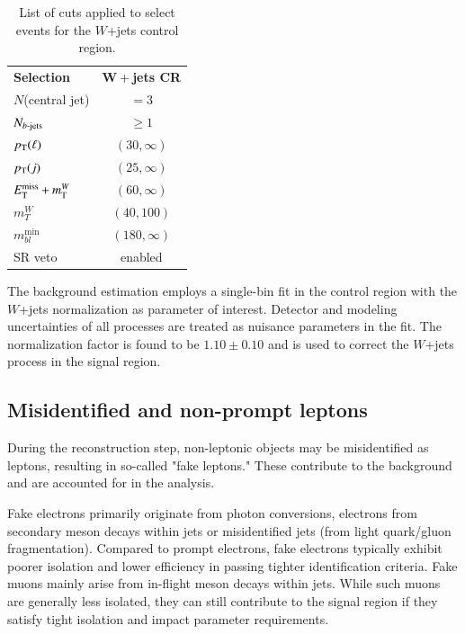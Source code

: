 \begin{table}[htbp]
    \centering
    \caption{List of cuts applied to select events for the $W$+jets control region.}%
    \begin{tabular}{l c}
      \hspace{1pt}\\
      \toprule
      \textbf{Selection}                    & $\bm{W+}$\textbf{jets CR} \\
      \midrule
      \( N \)(central jet)                  & \( = 3\)         \\
      \( N_{b\text{-jets}}\)                       & \( \geq 1 \)        \\
      \( p_{\text{T}}(\ell) \)                       & \( (30, \infty) \)  \\
      \( p_{\text{T}}(j)\)                           & \( (25, \infty) \)  \\
      \( E_{\text{T}}^{\text{miss}} + m_\mathrm{T}^W \)                     & \( (60, \infty) \)  \\
      \( m_T^W \)                           & \( (40,100) \) \\
      \(m_{bl}^\text{min}\)                 & \( (180, \infty)\) \\
      SR veto                               & enabled \\
      \bottomrule
    \end{tabular}
    \label{tab:WjetsCRDefinitions}
\end{table}

The background estimation employs a single-bin fit in the control region with the $W$+jets
normalization as parameter of interest.
Detector and modeling
uncertainties of all processes are treated as nuisance parameters in the fit.
The normalization factor is found to be $1.10\pm 0.10$ and is
used to correct the $W$+jets process in the signal region.

\subsection{Misidentified and non-prompt leptons}
\label{ch:FakeLep}

During the reconstruction step, non-leptonic objects may be misidentified as leptons, resulting in so-called "fake leptons." These contribute to the background and are accounted for in the analysis.

Fake electrons primarily originate from photon conversions, electrons from secondary meson decays within jets or misidentified jets (from light quark/gluon fragmentation).
Compared to prompt electrons, fake electrons typically exhibit poorer isolation and lower efficiency in passing tighter identification criteria.
Fake muons mainly arise from in-flight meson decays within jets.
While such muons are generally less isolated, they
can still contribute to the signal region if they satisfy tight isolation and impact parameter requirements.


